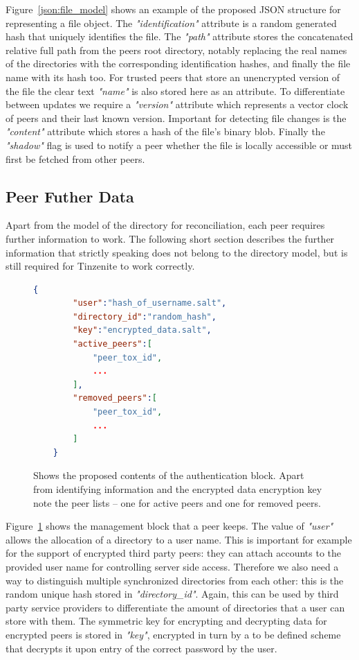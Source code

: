 Figure~\ref{json:file_model} shows an example of the proposed JSON structure for representing a file object.
The \textit{"identification"} attribute is a random generated hash that uniquely identifies the file.
The \textit{"path"} attribute stores the concatenated relative full path from the peers root directory, notably replacing the real names of the directories with the corresponding identification hashes, and finally the file name with its hash too.
For trusted peers that store an unencrypted version of the file the clear text \textit{"name"} is also stored here as an attribute.
To differentiate between updates we require a \textit{"version"} attribute which represents a vector clock of peers and their last known version.
Important for detecting file changes is the \textit{"content"} attribute which stores a hash of the file's binary blob.
Finally the \textit{"shadow"} flag is used to notify a peer whether the file is locally accessible or must first be fetched from other peers.

\subsection{Peer Futher Data}

Apart from the model of the directory for reconciliation, each peer requires further information to work.
The following short section describes the further information that strictly speaking does not belong to the directory model, but is still required for Tinzenite to work correctly.

\begin{figure}[htp]
    \begin{lstlisting}[language=json,firstnumber=0]
    {
        "user":"hash_of_username.salt",
        "directory_id":"random_hash",
        "key":"encrypted_data.salt",
        "active_peers":[
            "peer_tox_id",
            ...
        ],
        "removed_peers":[
            "peer_tox_id",
            ...
        ]
    }
    \end{lstlisting}
\caption[Authentication JSON Object]{Shows the proposed contents of the authentication block. Apart from identifying information and the encrypted data encryption key note the peer lists – one for active peers and one for removed peers.}
\label{json:auth_object}
\end{figure}

Figure~\ref{json:auth_object} shows the management block that a peer keeps.
The value of \textit{"user"} allows the allocation of a directory to a user name.
This is important for example for the support of encrypted third party peers: they can attach accounts to the provided user name for controlling server side access.
Therefore we also need a way to distinguish multiple synchronized directories from each other: this is the random unique hash stored in \textit{"directory\_id"}.
Again, this can be used by third party service providers to differentiate the amount of directories that a user can store with them.
The symmetric key for encrypting and decrypting data for encrypted peers is stored in \textit{"key"}, encrypted in turn by a to be defined scheme that decrypts it upon entry of the correct password by the user.


